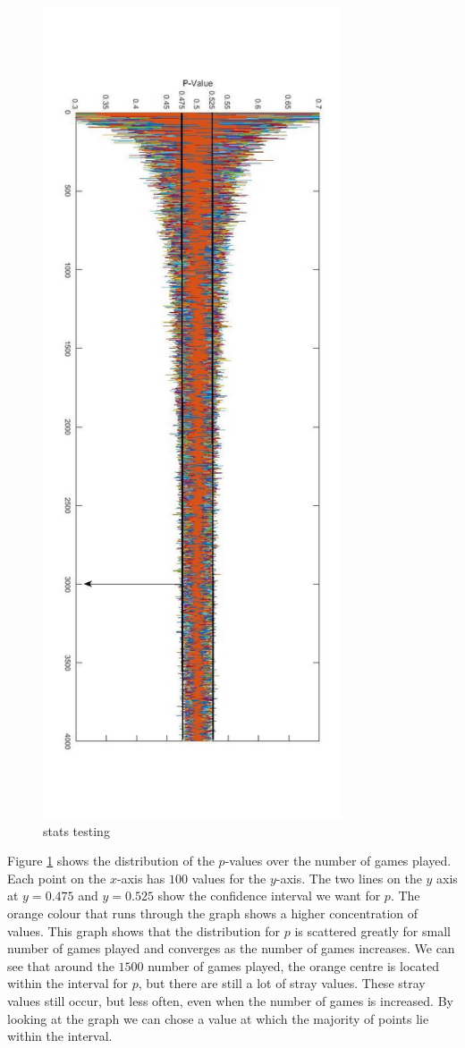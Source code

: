 \documentclass[a4paper,titlepage]{article}
\begin{document}
\begin{figure}
\centering
\includegraphics[height=24cm]{stats_testing}
\caption{stats testing\label{figure4}}
\end{figure}
Figure \ref{figure4} shows the distribution of the $p$-values over the number of games played. Each point on the $x$-axis has $100$ values for the $y$-axis. The two lines on the $y$ axis at $y=0.475$ and $y=0.525$ show the confidence interval we want for $p$. The orange colour that runs through the graph shows a higher concentration of values. This graph shows that the distribution for $p$ is scattered greatly for small number of games played and converges as the number of games increases. We can see that around the $1500$ number of games played, the orange centre is located within the interval for $p$, but there are still a lot of stray values. These stray values still occur, but less often, even when the number of games is increased. By looking at the graph we can chose a value at which the majority of points lie within the interval.\\ \\
\end{document}
